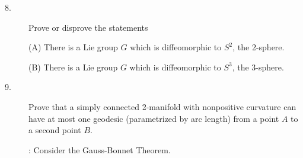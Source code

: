 \documentclass[bbb]{report}
\begin{document}
\begin{Large}
\begin{description}
\vspace{.5in}
\item[8.]
Prove or disprove the statements

\vspace{.1in}
\item[\quad] (A)
There is a Lie group $G$ which is diffeomorphic to $S^2$, the 2-sphere.

\vspace{.1in}
\item[\quad] (B)
There is a Lie group $G$ which is diffeomorphic to $S^3$, the 3-sphere.

\vspace{.5in}
\item[9.]
Prove that a simply connected 2-manifold with nonpositive
curvature can have at most one geodesic (parametrized by arc length)
from a point $A$ to a second point $B$.

\vspace{.1in}
\item[\quad] : Consider the Gauss-Bonnet Theorem.

\vfill
\clearpage


\end{description}
\end{Large}
\end{document}
